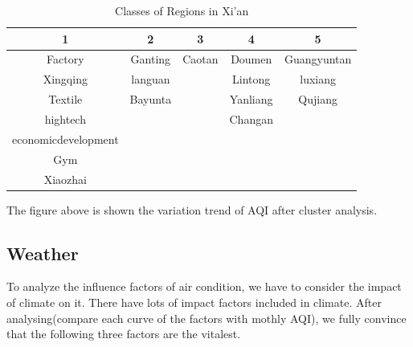 \documentclass[a4paper,11pt]{article}
\begin{document}
\begin{table}[h]
  \centering
  \caption{Classes of Regions in Xi'an}
    \begin{tabular}{ccccc}
    \toprule
    1     & 2     & 3     & 4     & 5 \\
    \midrule
    Factory & Ganting & Caotan & Doumen & Guangyuntan \\
    Xingqing & languan &       & Lintong & luxiang \\
    Textile & Bayunta &       & Yanliang & Qujiang \\
    hightech &       &       & Changan &  \\
    economicdevelopment &       &       &       &  \\
    Gym   &       &       &       &  \\
    Xiaozhai &       &       &       &  \\
    \bottomrule
    \end{tabular}%
  \label{tab:5class}%
\end{table}%



\par The figure above is shown the variation trend of AQI after cluster analysis.
\subsection{Weather}
\par To analyze the influence factors of air condition, we have to consider the impact of climate on it. There have lots of impact factors included in climate. After analysing(compare each curve of the factors with mothly AQI), we fully convince that the following three factors are the vitalest.
\end{document}
